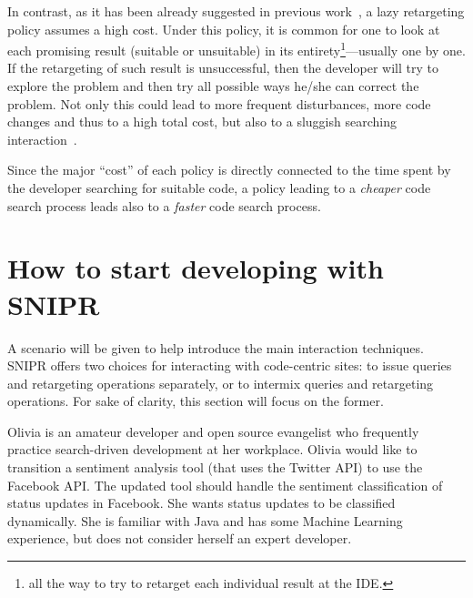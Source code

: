 In contrast, as it has been already suggested in previous work~\cite{Brandt:2009ew, Wightman:2012gc}, a lazy retargeting policy assumes a high cost. Under this policy, it is common for one to look at each promising result (suitable or unsuitable) in its entirety\footnote{all the way to try to retarget each individual result at the IDE.}---usually one by one. If the retargeting of such result is unsuccessful, then the developer will try to explore the problem and then try all possible ways he/she can correct the problem. Not only this could lead to more frequent disturbances, more code changes and thus to a high total cost, but also to a sluggish searching interaction~\cite{Gray:2000im}.

Since the major ``cost'' of each policy is directly connected to the time spent by the developer searching for suitable code, a policy leading to a \emph{cheaper} code search process leads also to a \emph{faster} code search process.

% 
% 
% 


\section{How to start developing with \uppercase{SnipR}}
\label{sec:sniprscenario}

A scenario will be given to help introduce the main interaction techniques. \uppercase{SnipR} offers two choices for interacting with code-centric sites: to issue queries and retargeting operations separately, or to intermix queries and retargeting operations. For sake of clarity, this section will focus on the former.

Olivia is an amateur developer and open source evangelist who frequently practice search-driven development at her workplace. Olivia would like to transition a sentiment analysis tool (that uses the Twitter API) to use the Facebook API. The updated tool should handle the sentiment classification of status updates in Facebook. She wants status updates to be classified dynamically. She is familiar with Java and has some Machine Learning experience, but does not consider herself an expert developer.

